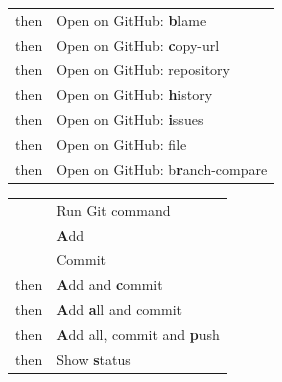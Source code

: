 \documentclass[a4paper]{article}
\newenvironment{keytable}[1]{%
  \begin{tabular}{|>{\rule{0pt}{0.85\normalbaselineskip}}l|l|}
  \hline
  \rowcolor[gray]{.8}
  \multicolumn{2}{|l|}{\bfseries #1}\\ \hline
}{%
  \end{tabular}\par\vspace{5mm}%
}
\begin{document}
\begin{center}
\begin{multicols*}{2}
\begin{keytable}{GitHub Integration}
\keys{Alt + g} then \keys{\textbf{b}}                      & Open on GitHub: \textbf{b}lame \\ \hline
\keys{Alt + g} then \keys{\textbf{c}}                      & Open on GitHub: \textbf{c}opy-url \\ \hline
\keys{Alt + g} then \keys{g}                               & Open on GitHub: repository \\ \hline
\keys{Alt + g} then \keys{\textbf{h}}                      & Open on GitHub: \textbf{h}istory \\ \hline
\keys{Alt + g} then \keys{\textbf{i}}                      & Open on GitHub: \textbf{i}ssues \\ \hline
\keys{Alt + g} then \keys{o}                               & Open on GitHub: file \\ \hline
\keys{Alt + g} then \keys{\textbf{r}}                      & Open on GitHub: b\textbf{r}anch-compare \\ \hline
\end{keytable}

\begin{keytable}{Git Plus (git-plus)}
\keys{Ctrl + Shift + h}                                    & Run Git command \\ \hline
\keys{Ctrl + Shift + \textbf{a}}                           & \textbf{A}dd \\ \hline
\keys{Ctrl + Shift + x}                                    & Commit \\ \hline
\keys{Ctrl + Shift + \textbf{a}} then \keys{\textbf{c}}    & \textbf{A}dd and \textbf{c}ommit \\ \hline %
\keys{Ctrl + Shift + \textbf{a}} then \keys{\textbf{a}}    & \textbf{A}dd \textbf{a}ll and commit \\ \hline
\keys{Ctrl + Shift + \textbf{a}} then \keys{\textbf{p}}    & \textbf{A}dd all, commit and \textbf{p}ush \\ \hline
\keys{Ctrl + Shift + a} then \keys{\textbf{s}}             & Show \textbf{s}tatus \\ \hline
\end{keytable}


\end{multicols*}
\end{center}
\end{document}
